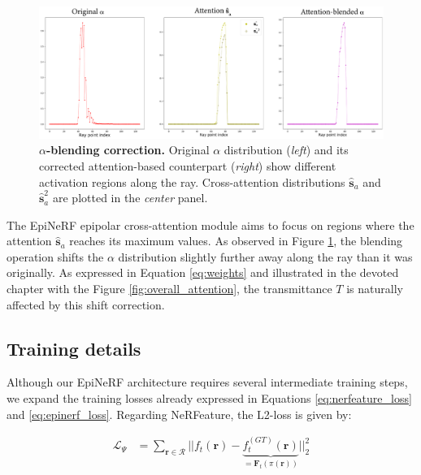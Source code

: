 \begin{figure}[h!]
    \begin{center}
  \includegraphics[width=\linewidth]{images/epinerf/SUPP_BLENDED_OVERLEAF.png}
  \caption{$\alpha$\textbf{-blending correction.} Original $\alpha$ distribution (\textit{left}) and its corrected attention-based counterpart (\textit{right}) show different activation regions along the ray. Cross-attention distributions $\hat{\textbf{s}}_{a}$ and $\hat{\textbf{s}}_{a}^{2}$ are plotted in the \textit{center} panel.}
  \label{fig:attention_construction}
  \end{center}
\end{figure}

The EpiNeRF epipolar cross-attention module aims to focus on regions where the attention $\hat{\textbf{s}}_{a}$ reaches its maximum values. As observed in Figure \ref{fig:attention_construction}, the blending operation shifts the $\alpha$ distribution slightly further away along the ray than it was originally. As expressed in Equation \ref{eq:weights} and illustrated in the devoted chapter with the Figure \ref{fig:overall_attention}, the transmittance $T$ is naturally affected by this shift correction. 

\subsection{Training details}
\label{appendix:epinerf-training}
Although our EpiNeRF architecture requires several intermediate training steps, we expand the training losses already expressed in Equations \ref{eq:nerfeature_loss} and \ref{eq:epinerf_loss}. Regarding NeRFeature, the L2-loss is given by: 

\begin{equation}
\begin{split}
 \mathcal{L}_{\Psi}&= \sum_{\mathbf{r}\in\mathcal{R}} || f_{t}(\mathbf{r}) - \underbrace{f_{t}^{(GT)}(\mathbf{r})}_{=\mathbf{F}_{t}(\pi(\mathbf{r}))} ||_{2}^{2} 
\end{split}
\end{equation}

